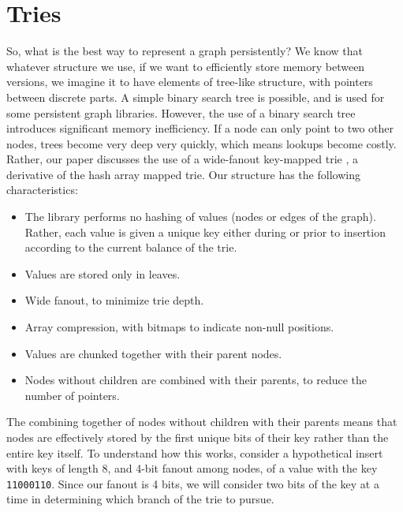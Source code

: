 \documentclass[preprint]{sigplanconf}
\begin{document}
\section{Tries}
So, what is the best way to represent a graph persistently?
We know that whatever structure we use, if we want to efficiently store memory between versions, we imagine it to have elements of tree-like structure, with pointers between discrete parts.
A simple binary search tree is possible, and is used for some persistent graph libraries.
However, the use of a binary search tree introduces significant memory inefficiency.
If a node can only point to two other nodes, trees become very deep very quickly, which means lookups become costly.
Rather, our paper discusses the use of a wide-fanout key-mapped trie , a derivative of the hash array mapped trie.
Our structure has the following characteristics:
\begin{itemize}
\item The library performs no hashing of values (nodes or edges of the graph).
Rather, each value is given a unique key either during or prior to insertion according to the current balance of the trie.
\item Values are stored only in leaves.
\item Wide fanout, to minimize trie depth.
\item Array compression, with bitmaps to indicate non-null positions.
\item Values are chunked together with their parent nodes.
\item Nodes without children are combined with their parents, to reduce the number of pointers.
\end{itemize}
The combining together of nodes without children with their parents means that nodes are effectively stored by the first unique bits of their key rather than the entire key itself.
To understand how this works, consider a hypothetical insert with keys of length 8, and 4-bit fanout among nodes, of a value with the key \texttt{11000110}.
Since our fanout is 4 bits, we will consider two bits of the key at a time in determining which branch of the trie to pursue.
\end{document}

